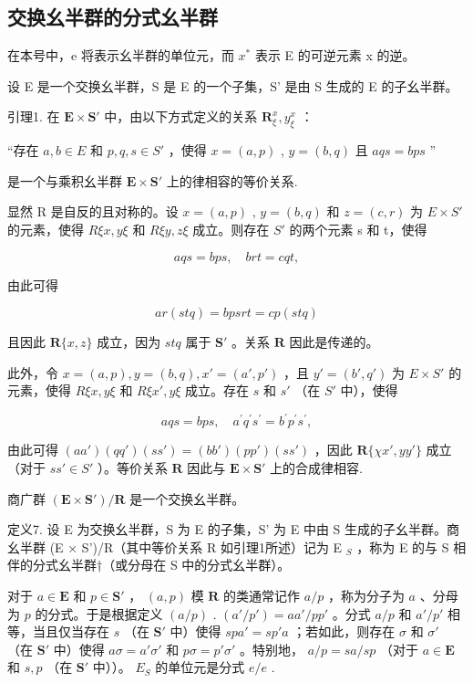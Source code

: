 \subsection{交换幺半群的分式幺半群}

在本号中，e 将表示幺半群的单位元，而 \(x^{*}\) 表示 E 的可逆元素 x 的逆。

设 E 是一个交换幺半群，S 是 E 的一个子集，S' 是由 S 生成的 E 的子幺半群。

引理1. 在 \(\mathbf{E} \times \mathbf{S}'\) 中，由以下方式定义的关系 \(\mathbf{R}_{\xi}^{x}, y_{\xi}^{x}\) ：

“存在 \(a, b \in E\) 和 \(p, q, s \in S'\) ，使得 \(x = (a, p)\) , \(y = (b, q)\) 且 \(aqs = bps\) ''

是一个与乘积幺半群 \(\mathbf{E} \times \mathbf{S}'\) 上的律相容的等价关系.

显然 R 是自反的且对称的。设 \(x = (a, p)\) , \(y = (b, q)\) 和 \(z = (c, r)\) 为 \(E \times S'\) 的元素，使得 \(R\xi x, y\xi\) 和 \(R\xi y, z\xi\) 成立。则存在 \(S'\) 的两个元素 s 和 t，使得

\[
a q s = b p s, \quad b r t = c q t,
\]

由此可得

\[
a r (s t q) = b p s r t = c p (s t q)
\]

且因此 \(\mathbf{R}\{x, z\}\) 成立，因为 \(stq\) 属于 \(\mathbf{S}'\) 。关系 \(\mathbf{R}\) 因此是传递的。

此外，令 \(x = (a, p), y = (b, q), x' = (a', p')\) ，且 \(y' = (b', q')\) 为 \(E \times S'\) 的元素，使得 \(R\xi x, y\xi\) 和 \(R\xi x', y\xi\) 成立。存在 \(s\) 和 \(s'\) （在 \(S'\) 中），使得

\[
a q s = b p s, \quad a ^ {\prime} q ^ {\prime} s ^ {\prime} = b ^ {\prime} p ^ {\prime} s ^ {\prime},
\]

由此可得 \((aa')(qq')(ss') = (bb')(pp')(ss')\) ，因此 \(\mathbf{R}\{\chi x', yy'\}\) 成立（对于 \(ss' \in S'\) ）。等价关系 \(\mathbf{R}\) 因此与 \(\mathbf{E} \times \mathbf{S}'\) 上的合成律相容.

商广群 \((\mathbf{E} \times \mathbf{S}')/\mathbf{R}\) 是一个交换幺半群。

定义7. 设 E 为交换幺半群，S 为 E 的子集，S' 为 E 中由 S 生成的子幺半群。商幺半群 (E × S')/R（其中等价关系 R 如引理1所述）记为 E \(_{S}\) ，称为 E 的与 S 相伴的分式幺半群†（或分母在 S 中的分式幺半群）。

对于 \(a \in \mathbf{E}\) 和 \(p \in \mathbf{S}'\) ， \((a, p)\) 模 \(\mathbf{R}\) 的类通常记作 \(a/p\) ，称为分子为 \(a\) 、分母为 \(p\) 的分式。于是根据定义 \((a/p)\) . \((a'/p') = aa'/pp'\) 。分式 \(a/p\) 和 \(a'/p'\) 相等，当且仅当存在 \(s\) （在 \(\mathbf{S}'\) 中）使得 \(spa' = sp'a\) ；若如此，则存在 \(\sigma\) 和 \(\sigma'\) （在 \(\mathbf{S}'\) 中）使得 \(a\sigma = a'\sigma'\) 和 \(p\sigma = p'\sigma'\) 。特别地， \(a/p = sa/sp\) （对于 \(a \in \mathbf{E}\) 和 \(s, p\) （在 \(\mathbf{S}'\) 中））。 \(E_S\) 的单位元是分式 \(e/e\) .

